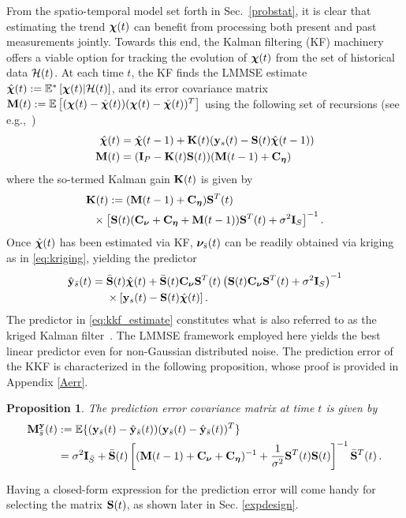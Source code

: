 \documentclass[draftcls,onecolumn,12pt]{IEEEtran}
\def \yst {{\b{y}_s(t)}}
\def \ybt {{\b{y}_{\bar{s}}(t)}}
\def \yh {{\hat{\b{y}}_{\bar{s}}}}
\def \chit {{\bs{\chi}(t)}}
\def \chih {{\hat{\bs{\chi}}}}
\def \nubt {{\bs{\nu}_{\bar{s}}(t)}}
\def \Exp {\mathbb{E}}
\def \My {{\b{M}^{\b{y}}_{\bar{s}}(t)}}
\def \Kt {{\b{K}(t)}}
\def \ceta {{\b{C}_{\bs{\eta}}}}
\def \si  {{\sigma^2\b{I}_S}}
\def \cnu {{\b{C}_{\bs{\nu}}}}
\def \St {{\b{S}(t)}}
\def \Stt {{\b{S}^T(t)}}
\def \Sb {{\bar{\b{S}}(t)}}
\def \Sbt {{\bar{\b{S}}^T(t)}}
\theoremstyle{plain}\newtheorem{thm}{Theorem}
\newtheorem{prop}{Proposition}
\theoremstyle{definition}
\theoremstyle{remark}
\begin{document}
From the spatio-temporal model set forth in Sec.~\ref{probstat}, it is clear that estimating the trend $\boldsymbol{\chi}(t)$ can benefit from processing both present and past measurements jointly. 
Towards this end, the Kalman filtering (KF) machinery offers a viable option for tracking the evolution of $\boldsymbol{\chi}(t)$ from the set of historical data $\mathcal{H}(t)$. 
At each time $t$, the KF finds the LMMSE estimate $\chih(t) := \Es{\chit | \c{H}(t)}$, and its error covariance matrix $\b{M}(t) := \E{(\chit-\chih(t))(\chit-\chih(t))^T}$ using the following set of recursions (see e.g.,~\cite[Ch.~3]{AnM79})
\begin{subequations}\label{kkfeq}
\begin{align}
\chih(t) &= \chih(t-1) + \Kt(\yst - \St\chih(t-1))\label{iterx}\\
\b{M}(t) &= (\b{I}_P - \Kt\St)(\b{M}(t-1)+\ceta)\label{iterM}
\end{align}
\end{subequations}
where the so-termed Kalman gain $\Kt$ is given by
\begin{align}\label{gain}
\Kt &:= (\b{M}(t-1)+\ceta) \Stt \nonumber\\
&\hspace{-0.5cm}\times \left[\St(\cnu +\ceta + \b{M}(t-1))\Stt + \si \right]^{-1}.
\end{align}
Once $\chih(t)$ has been estimated via KF, $\nubt$ can be readily obtained via kriging as in \eqref{eq:kriging}, yielding the predictor
 {
\begin{align}\label{eq:kkf_estimate}
\yh(t) &= \Sb\chih(t) + \Sb\cnu\Stt\left(\St\cnu\Stt + \sigma^2\b{I}_S\right)^{-1}\nonumber\\
&~~~~\times \left[\yst - \St\chih(t)\right].
\end{align}
}
The predictor in \eqref{eq:kkf_estimate} constitutes what is also referred to as the kriged Kalman filter~\cite{MGRA98,WiC99}. 
The LMMSE framework employed here yields the best linear predictor even for non-Gaussian distributed noise. The prediction error of the KKF is characterized in the following proposition, whose proof is provided in Appendix \ref{Aerr}.
\begin{prop}
The prediction error covariance matrix at time $t$ is given by
\begin{subequations}
\begin{align}\label{errormat}
\My  &:= \Exp\{(\ybt-\yh(t))(\ybt-\yh(t))^T\} \\
&=\sigma^2\b{I}_{\bar{S}} + \Sb\left[(\b{M}(t-1) + \cnu + \ceta)^{-1} + \frac{1}{\sigma^2}\Stt\St\right]^{-1}\Sbt\,.
\end{align}
\end{subequations}
\end{prop}
Having a closed-form expression for the prediction error will come handy for selecting the matrix $\mathbf{S}(t)$, as shown later in Sec. \ref{expdesign}.
\end{document}
